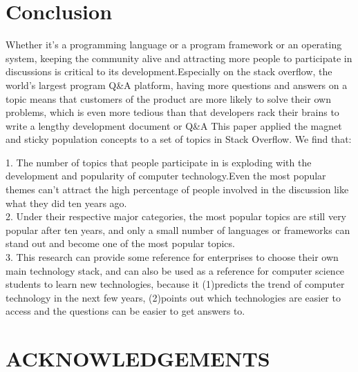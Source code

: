 \documentclass[conference]{IEEEtran}
\begin{document}
\section{Conclusion}

Whether it's a programming language or a program framework or an operating system, keeping the community alive and attracting more people to participate in discussions is critical to its development.Especially on the stack overflow, the world's largest program Q\&A platform, having more questions and answers on a topic means that customers of the product are more likely to solve their own problems, which is even more tedious than that developers rack their brains to write a lengthy development document or Q\&A This paper applied the magnet and sticky population concepts to a set of topics in Stack Overflow. We find that:

1. The number of topics that people participate in is exploding with the development and popularity of computer technology.Even the most popular themes can't attract the high percentage of people involved in the discussion like what they did ten years ago.\\


2. Under their respective major categories, the most popular topics are still very popular after ten years, and only a small number of languages or frameworks can stand out and become one of the most popular topics.\\


3. This research can provide some reference for enterprises to choose their own main technology stack, and can also be used as a reference for computer science students to learn new technologies, because it (1)predicts the trend of computer technology in the next few years, (2)points out which technologies are easier to access and the questions can be easier to get answers to.\\



\section{ACKNOWLEDGEMENTS}


\end{document}
